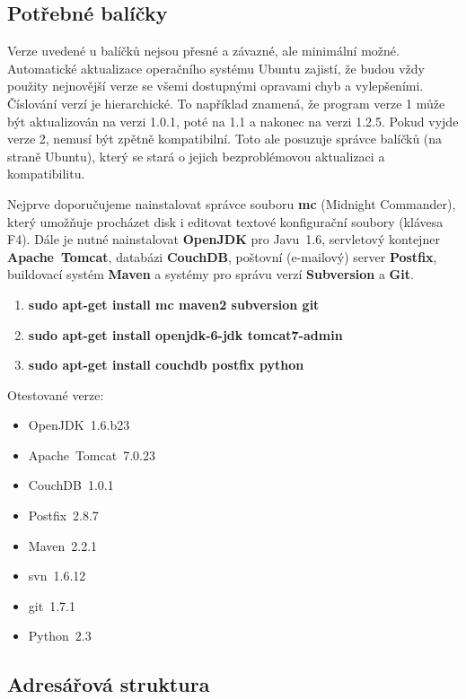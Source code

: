 \subsection{Potřebné balíčky}

Verze uvedené u balíčků nejsou přesné a závazné, ale minimální možné. Automatické aktualizace operačního systému Ubuntu zajistí, že budou vždy použity nejnovější verze se všemi dostupnými opravami chyb a vylepšeními. Číslování verzí je hierarchické. To například znamená, že program verze 1 může být aktualizován na verzi 1.0.1, poté na 1.1 a nakonec na verzi 1.2.5. Pokud vyjde verze 2, nemusí být zpětně kompatibilní. Toto ale posuzuje správce balíčků (na straně Ubuntu), který se stará o jejich bezproblémovou aktualizaci a kompatibilitu.

Nejprve doporučujeme nainstalovat správce souboru {\bf mc} (Midnight Commander), který umožňuje procházet disk i editovat textové konfigurační soubory (klávesa F4). Dále je nutné nainstalovat {\bf OpenJDK} pro Javu~1.6, servletový kontejner {\bf Apache~Tomcat}, databázi {\bf CouchDB}, poštovní (e-mailový) server {\bf Postfix}, buildovací systém {\bf Maven} a systémy pro správu verzí {\bf Subversion} a {\bf Git}.

\begin{enumerate}
\item{\bf sudo apt-get install mc maven2 subversion git}
\item{\bf sudo apt-get install openjdk-6-jdk tomcat7-admin}
\item{\bf sudo apt-get install couchdb postfix python}
\end{enumerate}

Otestované verze:

\begin{itemize}
\item{OpenJDK~1.6.b23}
\item{Apache~Tomcat~7.0.23}
\item{CouchDB~1.0.1}
\item{Postfix~2.8.7}
\item{Maven~2.2.1}
\item{svn~1.6.12}
\item{git~1.7.1}
\item{Python~2.3}
\end{itemize}

\subsection{Adresářová struktura}

